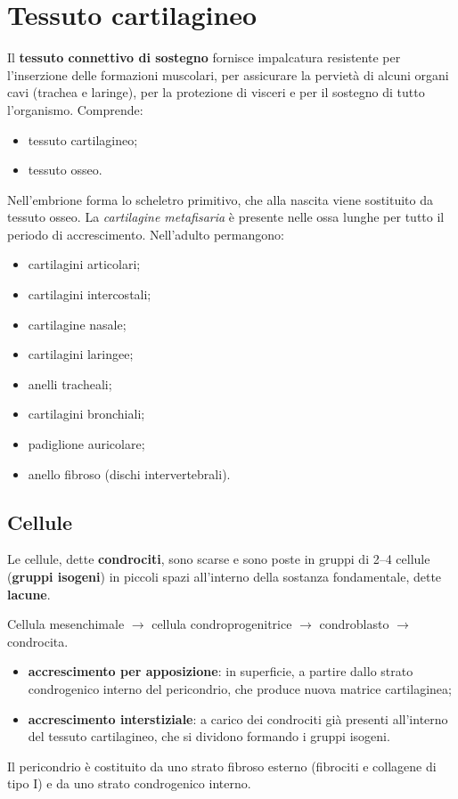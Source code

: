 \section{Tessuto cartilagineo}

Il \textbf{tessuto connettivo di sostegno} fornisce impalcatura resistente per l'inserzione delle formazioni muscolari, per assicurare la pervietà di alcuni organi cavi (trachea e laringe), per la protezione di visceri e per il sostegno di tutto l'organismo. Comprende:
\begin{itemize}
  \item tessuto cartilagineo;
  \item tessuto osseo.
\end{itemize}

Nell'embrione forma lo scheletro primitivo, che alla nascita viene sostituito da tessuto osseo. La \textit{cartilagine metafisaria} è presente nelle ossa lunghe per tutto il periodo di accrescimento. Nell'adulto permangono:
\begin{itemize}
  \item cartilagini articolari;
  \item cartilagini intercostali;
  \item cartilagine nasale;
  \item cartilagini laringee;
  \item anelli tracheali;
  \item cartilagini bronchiali;
  \item padiglione auricolare;
  \item anello fibroso (dischi intervertebrali).
\end{itemize}

\subsection{Cellule}

Le cellule, dette \textbf{condrociti}, sono scarse e sono poste in gruppi di 2--4 cellule (\textbf{gruppi isogeni}) in piccoli spazi all'interno della sostanza fondamentale, dette \textbf{lacune}.

Cellula mesenchimale $\rightarrow$ cellula condroprogenitrice $\rightarrow$ condroblasto $\rightarrow$ condrocita.

\begin{itemize}
  \item \textbf{accrescimento per apposizione}: in superficie, a partire dallo strato condrogenico interno del pericondrio, che produce nuova matrice cartilaginea;
  \item \textbf{accrescimento interstiziale}: a carico dei condrociti già presenti all'interno del tessuto cartilagineo, che si dividono formando i gruppi isogeni.
\end{itemize}
Il pericondrio è costituito da uno strato fibroso esterno (fibrociti e collagene di tipo I) e da uno strato condrogenico interno.


